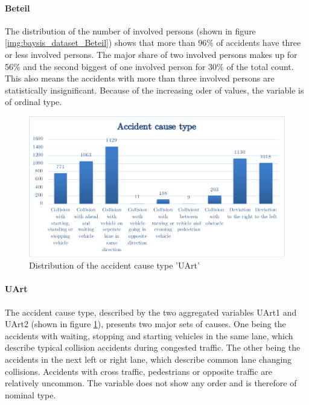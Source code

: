 \documentclass[a4paper,12pt]{report}
\begin{document}
\paragraph{Beteil}
The distribution of the number of involved persons (shown in figure \ref{img:baysis_dataset_Beteil}) shows that more than 96\% of accidents have three or less involved persons. The major share of two involved persons makes up for 56\% and the second biggest of one involved person for 30\% of the total count. This also means the accidents with more than three involved persons are statistically insignificant. Because of the increasing oder of values, the variable is of ordinal type.

\begin{figure}[h]
	\centering
	\includegraphics[scale=0.6]{./assets/baysis_dataset_UArt.pdf}
	\caption{Distribution of the accident cause type 'UArt'}
	\label{img:baysis_dataset_UArt}
\end{figure}

\paragraph{UArt}
The accident cause type, described by the two aggregated variables UArt1 and UArt2 (shown in figure \ref{img:baysis_dataset_UArt}), presents two major sets of causes. One being the accidents with waiting, stopping and starting vehicles in the same lane, which describe typical collision accidents during congested traffic. The other being the accidents in the next left or right lane, which describe common lane changing collisions. Accidents with cross traffic, pedestrians or opposite traffic are relatively uncommon. The variable does not show any order and is therefore of nominal type.
\end{document}
